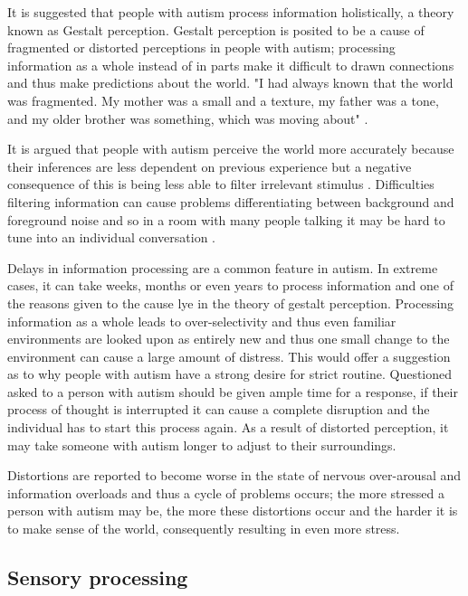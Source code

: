 \documentclass[11pt]{report}
\begin{document}
It is suggested that people with autism process information holistically, a theory known as Gestalt perception. Gestalt perception is posited to be a cause of fragmented or distorted perceptions in people with autism\cite{olgab}; processing information as a whole instead of in parts make it difficult to drawn connections and thus make predictions about the world. "I had always known that the world was fragmented. My mother was a small and a texture, my father was a tone, and my older brother was something, which was moving about" \cite{williams1992}. 

It is argued that people with autism perceive the world more accurately because their inferences are less dependent on previous experience but a negative consequence of this is being less able to filter irrelevant stimulus \cite{bayes}. Difficulties filtering information can cause problems differentiating between background and foreground noise and so in a room with many people talking it may be hard to tune into an individual conversation \cite{bayes}. 

Delays in information processing are a common feature in autism. In extreme cases, it can take weeks, months or even years to process information and one of the reasons given to the cause lye in the theory of gestalt perception. Processing information as a whole leads to over-selectivity and thus even familiar environments are looked upon as entirely new and thus one small change to the environment can cause a large amount of distress\cite{olgab}. This would offer a suggestion as to why people with autism have a strong desire for strict routine. Questioned asked to a person with autism should be given ample time for a response, if their process of thought is interrupted it can cause a complete disruption and the individual has to start this process again\cite{olgab}. As a result of distorted perception, it may take someone with autism longer to adjust to their surroundings. 

Distortions are reported to become worse in the state of nervous over-arousal and information overloads\cite{olgab} and thus a cycle of problems occurs; the more stressed a person with autism may be, the more these distortions occur and the harder it is to make sense of the world, consequently resulting in even more stress.

\subsection{Sensory processing}
\end{document}
